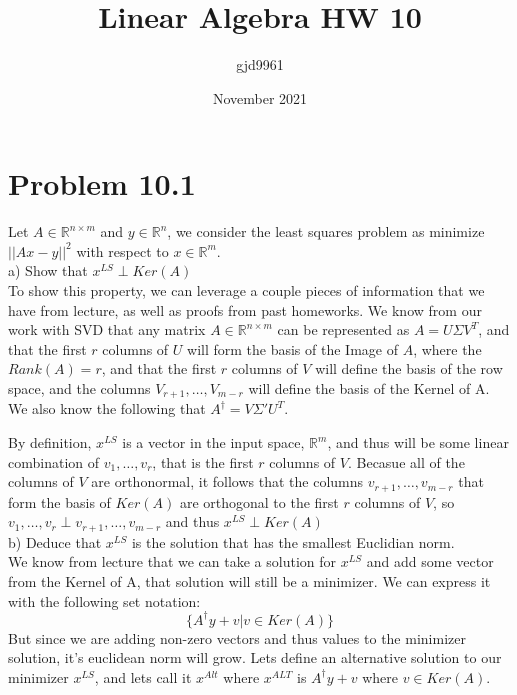 \documentclass[12pt,twoside]{article}
\title{Linear Algebra HW 10}
\author{gjd9961 }
\date{November 2021}
\newcommand{\R}{\mathbb{R}}
\begin{document}
\maketitle

\newpage

\section{Problem 10.1}
Let $A \in \R^{n \times m}$ and $y \in \R^n$, we consider the least squares problem as minimize $||Ax - y || ^2 $ with respect to $x \in \R^m$. \\

a) Show that $x^{LS} \perp Ker(A)$ \\

To show this property, we can leverage a couple pieces of information that we have from lecture, as well as proofs from past homeworks. We know from our work with SVD that any matrix $A \in \R^{n\times m}$ can be represented as $A = U\Sigma V^T$, and that the first $r$ columns of $U$ will form the basis of the Image of $A$, where the $Rank(A) = r$, and that the first $r$ columns of $V$ will define the basis of the row space, and the columns $V_{r+1}, \dots, V_{m-r}$ will define the basis of the Kernel of A. We also know the following that $A^{\dagger} = V\Sigma ' U^T$. 


By definition, $x^{LS}$ is a vector in the input space, $\R^m$,  and thus will be some linear combination of $v_1, \dots, v_r$, that is the first $r$ columns of $V$. Becasue all of the columns of $V$ are orthonormal, it follows that the columns $v_{r+1}, \dots, v_{m-r}$ that form the basis of $Ker(A)$ are orthogonal to the first $r$ columns of $V$, so $v_1, \dots, v_r \perp v_{r+1}, \dots, v_{m-r}$ and thus $x^{LS} \perp Ker(A)$\\

b) Deduce that $x^{LS}$ is the solution that has the smallest Euclidian norm. \\ 

We know from lecture that we can take a solution for $x^{LS}$ and add some vector from the Kernel of A, that solution will still be a minimizer. We can express it with the following set notation:
$$
    \{A^{\dagger}y  + v  | v \in Ker(A) \}
$$
But since we are adding non-zero vectors and thus values to the minimizer solution, it's euclidean norm will grow. Lets define an alternative solution to our minimizer $x^{LS}$, and lets call it $x^{Alt}$ where $x^{ALT}$ is $A^{\dagger}y + v$ where $v \in Ker(A)$. 
\end{document}
